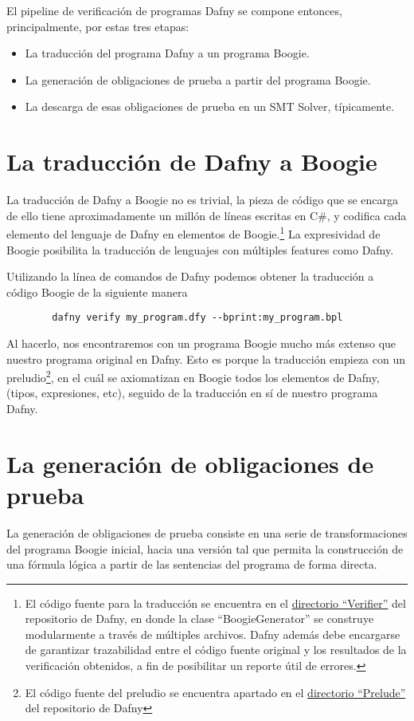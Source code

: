 \documentclass[12pt, a4paper, openany, fleqn]{book}
\begin{document}
    El pipeline de verificación de programas Dafny se compone entonces, principalmente, por estas tres etapas:
    \begin{itemize}
        \item La traducción del programa Dafny a un programa Boogie.
        \item La generación de obligaciones de prueba a partir del programa Boogie.
        \item La descarga de esas obligaciones de prueba en un SMT Solver, típicamente.
    \end{itemize}

    \section{La traducción de Dafny a Boogie}
    La traducción de Dafny a Boogie no es trivial, la pieza de código que se encarga de ello tiene aproximadamente un millón de líneas escritas en C\#, y codifica cada elemento del lenguaje de Dafny en elementos de Boogie.\footnote{El código fuente para la traducción se encuentra en el \href{https://github.com/dafny-lang/dafny/tree/v4.7.0/Source/DafnyCore/Verifier}{directorio ``Verifier''} del repositorio de Dafny, en donde la clase ``BoogieGenerator'' se construye modularmente a través de múltiples archivos. Dafny además debe encargarse de garantizar trazabilidad entre el código fuente original y los resultados de la verificación obtenidos, a fin de posibilitar un reporte útil de errores.} La expresividad de Boogie posibilita la traducción de lenguajes con múltiples features como Dafny.

    Utilizando la línea de comandos de Dafny podemos obtener la traducción a código Boogie de la siguiente manera
    \begin{verbatim}
        dafny verify my_program.dfy --bprint:my_program.bpl
    \end{verbatim}
    Al hacerlo, nos encontraremos con un programa Boogie mucho más extenso que nuestro programa original en Dafny. Esto es porque la traducción empieza con un preludio\footnote{El código fuente del preludio se encuentra apartado en el \href{https://github.com/dafny-lang/dafny/blob/v4.7.0/Source/DafnyCore/DafnyPrelude.bpl}{directorio ``Prelude''} del repositorio de Dafny}, en el cuál se axiomatizan en Boogie todos los elementos de Dafny, (tipos, expresiones, etc), seguido de la traducción en sí de nuestro programa Dafny.

    \section{La generación de obligaciones de prueba}
    La generación de obligaciones de prueba consiste en una serie de transformaciones del programa Boogie inicial, hacia una versión tal que permita la construcción de una fórmula lógica a partir de las sentencias del programa de forma directa.
\end{document}
